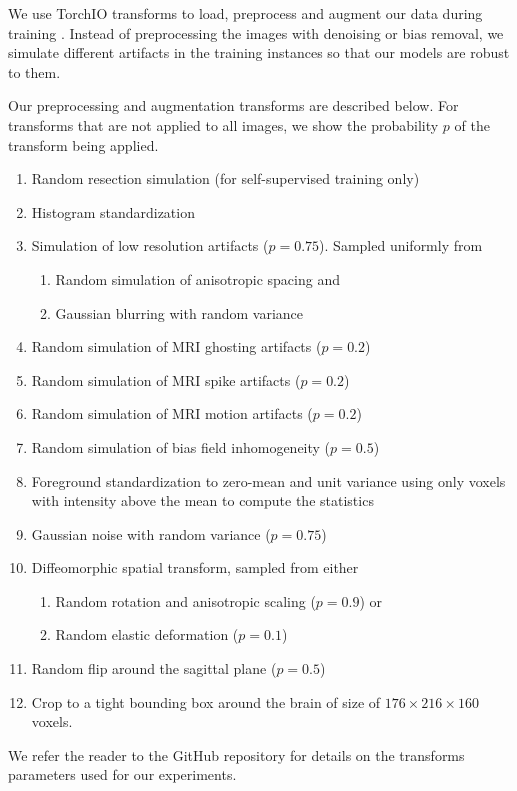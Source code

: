 We use TorchIO transforms to load, preprocess and augment our data during training \cite{perez-garcia_torchio_2020}.
Instead of preprocessing the images with denoising or bias removal, we simulate different artifacts in the training instances so that our models are robust to them.

Our preprocessing and augmentation transforms are described below.
For transforms that are not applied to all images, we show the probability $p$ of the transform being applied.

\begin{enumerate}
    \item Random resection simulation (for self-supervised training only)
    \item Histogram standardization \cite{nyul_new_2000}
    \item Simulation of low resolution artifacts ($p = 0.75$). Sampled uniformly from
    \begin{enumerate}
        \item Random simulation of anisotropic spacing \cite{billot_partial_2020} and
        \item Gaussian blurring with random variance
    \end{enumerate}
    \item Random simulation of MRI ghosting artifacts \cite{shaw_heteroscedastic_2020} ($p = 0.2$)
    \item Random simulation of MRI spike artifacts \cite{shaw_heteroscedastic_2020} ($p = 0.2$)
    \item Random simulation of MRI motion artifacts \cite{shaw_mri_2019} ($p = 0.2$)
    \item Random simulation of bias field inhomogeneity \cite{sudre_longitudinal_2017} ($p = 0.5$)
    \item Foreground standardization to zero-mean and unit variance using only voxels with intensity above the mean to compute the statistics
    \item Gaussian noise with random variance ($p = 0.75$)
    \item Diffeomorphic spatial transform, sampled from either
    \begin{enumerate}
        \item Random rotation and anisotropic scaling ($p = 0.9$) or
        \item Random elastic deformation ($p = 0.1$)
    \end{enumerate}
    \item Random flip around the sagittal plane ($p = 0.5$)
    \item Crop to a tight bounding box around the brain of size of $176 \times 216 \times 160$ voxels.
\end{enumerate}

We refer the reader to the GitHub repository for details on the transforms parameters used for our experiments.